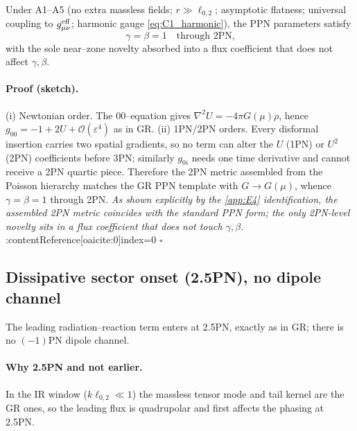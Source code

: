 \documentclass{iopjournal}
\begin{document}
\begin{conceptbox}[Statement.]
	Under A1--A5 (no extra massless fields; $r\gg\ell_{0,2}$; asymptotic flatness; universal coupling to $g^{\rm eff}_{\mu\nu}$; harmonic gauge \eqref{eq:C1_harmonic}), the PPN parameters satisfy
\[
\gamma=\beta=1 \quad \text{through 2PN,}
\]
with the sole near–zone novelty absorbed into a flux coefficient that does not affect $\gamma,\beta$.
\end{conceptbox}

\paragraph{Proof (sketch).}
(i) Newtonian order. The $00$–equation gives $\nabla^2U=-4\pi G(\mu)\rho$, hence $g_{00}=-1+2U+\mathcal O(\varepsilon^4)$ as in GR.
(ii) 1PN/2PN orders. Every disformal insertion carries two spatial gradients, so no term can alter the $U$ (1PN) or $U^2$ (2PN) coefficients before 3PN; similarly $g_{0i}$ needs one time derivative and cannot receive a 2PN quartic piece. Therefore the 2PN metric assembled from the Poisson hierarchy matches the GR PPN template with $G\to G(\mu)$, whence $\gamma=\beta=1$ through 2PN. \emph{As shown explicitly by the \cref{app:E4} identification, the assembled 2PN metric coincides with the standard PPN form; the only 2PN-level novelty sits in a flux coefficient that does not touch $\gamma,\beta$.} :contentReference[oaicite:0]{index=0}
\hfill$\square$

\subsection{Dissipative sector onset (2.5PN), no dipole channel}\label{app:C4}
    
\begin{conceptbox}[Statement.]
	The leading radiation–reaction term enters at 2.5PN, exactly as in GR; there is no $(-1)$PN dipole channel.
\end{conceptbox}
\paragraph{Why 2.5PN and not earlier.}
In the IR window ($k\ell_{0,2}\ll 1$) the massless tensor mode and tail kernel are the GR ones, so the leading flux is quadrupolar and first affects the phasing at 2.5PN.
\end{document}
